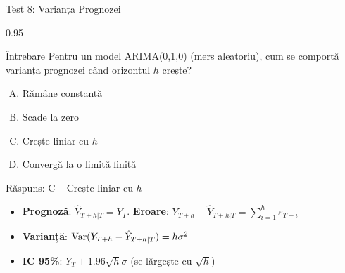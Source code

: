\documentclass[9pt, aspectratio=169, t]{beamer}
\begin{document}
\begin{frame}{Test 8: Varianța Prognozei}
    \begin{cminipage}{0.95\textwidth}
    \begin{alertblock}{Întrebare}
        Pentru un model ARIMA(0,1,0) (mers aleatoriu), cum se comportă varianța prognozei când orizontul $h$ crește?
    \end{alertblock}

    \vspace{0.1cm}

    \begin{enumerate}[A)]\setlength{\itemsep}{0pt}
        \item Rămâne constantă
        \item Scade la zero
        \item Crește liniar cu $h$
        \item Convergă la o limită finită
    \end{enumerate}

    \vspace{0.1cm}
    \pause
    \begin{exampleblock}{Răspuns: C -- Crește liniar cu $h$}
        {\small
        \begin{itemize}\setlength{\itemsep}{0pt}
        \item \textbf{Prognoză}: $\hat{Y}_{T+h|T} = Y_T$. \textbf{Eroare}: $Y_{T+h} - \hat{Y}_{T+h|T} = \sum_{i=1}^{h} \varepsilon_{T+i}$
        \item \textbf{Varianță}: $\text{Var}(Y_{T+h} - \hat{Y}_{T+h|T}) = h\sigma^2$
        \item \textbf{IC 95\%}: $Y_T \pm 1.96\sqrt{h}\sigma$ (se lărgește cu $\sqrt{h}$)
        \end{itemize}
        }
    \end{exampleblock}
    \end{cminipage}
\end{frame}
\end{document}
